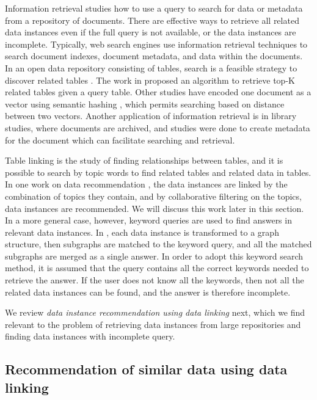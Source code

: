 Information retrieval studies how to use a query to search for data or metadata from a repository of documents. There are effective ways to retrieve all related data instances even if the full query is not available, or the data instances are incomplete. Typically, web search engines use information retrieval techniques to search document indexes, document metadata, and data within the documents. In an open data repository consisting of tables, search is a feasible strategy to discover related tables \cite{Miller2018MakingOD} \cite{10.14778/3229863.3240491}. The work in \cite{Nargesian2018Table} proposed an algorithm to retrieve top-K related tables given a query table. Other studies have encoded one document as a vector using semantic hashing \cite{Salakhutdinov2009Semantic}, which permits searching based on distance between two vectors. Another application of information retrieval is in library studies, where documents are archived, and studies were done to create metadata for the document \cite{Park2015Evaluation} which can facilitate searching and retrieval.

Table linking is the study of finding relationships between tables, and it is possible to search by topic words to find related tables and related data in tables. In one work on data recommendation \cite{conf/esws/EllefiBDT16}, the data instances are linked by the combination of topics they contain, and by collaborative filtering on the topics, data instances are recommended. We will discuss this work later in this section. In a more general case, however, keyword queries are used to find answers in relevant data instances. In \cite{DBLP:journals/pvldb/ChanialDGLNM18}, each data instance is transformed to a graph structure, then subgraphs are matched to the keyword query, and all the matched subgraphs are merged as a single answer. In order to adopt this keyword search method, it is assumed that the query contains all the correct keywords needed to retrieve the answer. If the user does not know all the keywords, then not all the related data instances can be found, and the answer is therefore incomplete.

We review \textit{data instance recommendation using data linking} next, which we find relevant to the problem of retrieving data instances from large repositories and finding data instances with incomplete query.

\subsection{Recommendation of similar data using data linking}
\label{ssec:RecommendationOfSimilarDataUsingDataLinking}

